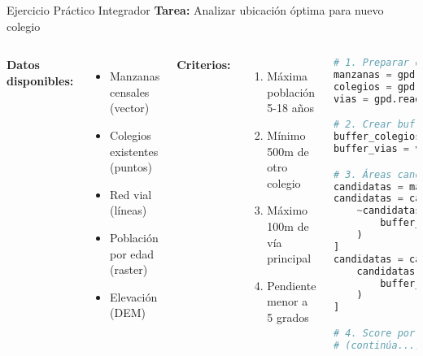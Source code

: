 \documentclass[10pt]{beamer}
\begin{document}
\begin{frame}[fragile]{Ejercicio Práctico Integrador}
    \textbf{Tarea:} Analizar ubicación óptima para nuevo colegio
    
    \begin{columns}
        \textbf{Datos disponibles:}
        \begin{itemize}
            \item Manzanas censales (vector)
            \item Colegios existentes (puntos)
            \item Red vial (líneas)
            \item Población por edad (raster)
            \item Elevación (DEM)
        \end{itemize}
        
        \textbf{Criterios:}
        \begin{enumerate}
            \item Máxima población 5-18 años
            \item Mínimo 500m de otro colegio
            \item Máximo 100m de vía principal
            \item Pendiente menor a 5 grados
        \end{enumerate}
        
        \begin{lstlisting}[language=Python, caption=Análisis multicriterio]
# 1. Preparar datos
manzanas = gpd.read_file('manzanas.shp')
colegios = gpd.read_file('colegios.geojson')
vias = gpd.read_file('vias.shp')

# 2. Crear buffers
buffer_colegios = colegios.buffer(500)
buffer_vias = vias.buffer(100)

# 3. Áreas candidatas
candidatas = manzanas.copy()
candidatas = candidatas[
    ~candidatas.intersects(
        buffer_colegios.unary_union
    )
]
candidatas = candidatas[
    candidatas.intersects(
        buffer_vias.unary_union
    )
]

# 4. Score por población
# (continúa...)
        \end{lstlisting}
    \end{columns}
\end{frame}
\end{document}
